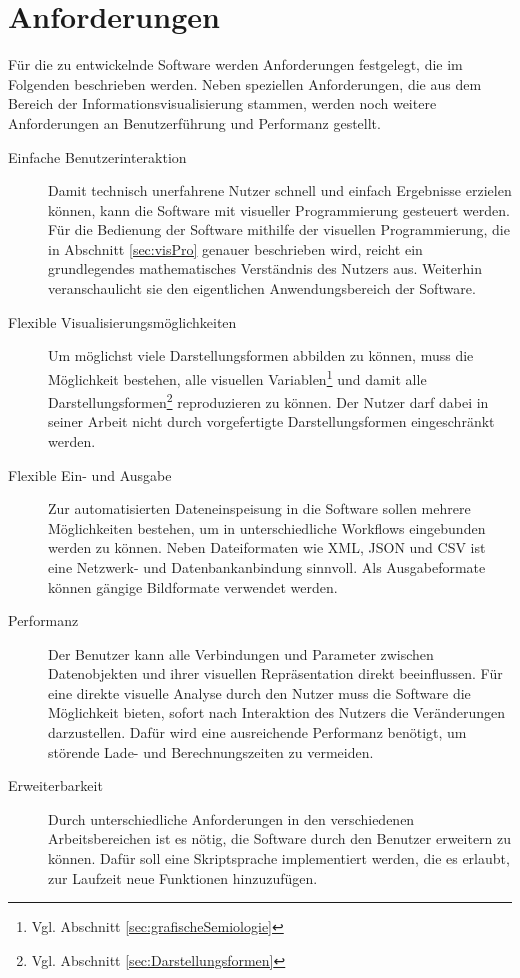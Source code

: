 \documentclass[a4paper, 
               12pt,
               DIV=calc,
               version=first,
               pdftex,
               headsepline,
               footsepline,
               bibliography=totocnumbered,
               listof=numbered]{scrreprt}
\begin{document}
\section{Anforderungen}
\label{sec:Anforderungen}
Für die zu entwickelnde Software werden Anforderungen festgelegt, die
im Folgenden beschrieben werden. Neben speziellen Anforderungen, die aus
dem Bereich der Informationsvisualisierung stammen, werden noch weitere
Anforderungen an Benutzerführung und Performanz gestellt.
\begin{description}
\item[Einfache Benutzerinteraktion]
Damit technisch unerfahrene Nutzer schnell und einfach Ergebnisse erzielen können, kann die Software
mit visueller Programmierung gesteuert werden. Für die Bedienung der Software mithilfe der visuellen
Programmierung, die in Abschnitt \ref{sec:visPro} genauer beschrieben wird,
reicht ein grundlegendes mathematisches Verständnis des Nutzers aus.
Weiterhin veranschaulicht sie den eigentlichen Anwendungsbereich der Software.
\item[Flexible Visualisierungsmöglichkeiten]
Um möglichst viele Darstellungsformen abbilden zu können, muss die 
Möglichkeit bestehen, alle visuellen Variablen\footnote{Vgl. Abschnitt
\ref{sec:grafischeSemiologie}} und damit alle Darstellungsformen\footnote{Vgl. Abschnitt
\ref{sec:Darstellungsformen}} reproduzieren zu können. Der Nutzer darf dabei
in seiner Arbeit nicht durch vorgefertigte Darstellungsformen
eingeschränkt werden.
\item[Flexible Ein- und Ausgabe]
Zur automatisierten Dateneinspeisung in die Software sollen mehrere Möglichkeiten
bestehen, um in unterschiedliche Workflows eingebunden werden zu können.
Neben Dateiformaten wie XML, JSON und CSV ist eine Netzwerk- und
Datenbankanbindung sinnvoll. Als Ausgabeformate können gängige Bildformate
verwendet werden.
\item[Performanz]
Der Benutzer kann alle Verbindungen und Parameter zwischen Datenobjekten und ihrer
visuellen Repräsentation direkt beeinflussen. Für eine direkte visuelle Analyse
durch den Nutzer muss die Software die Möglichkeit bieten, sofort
nach Interaktion des Nutzers die Veränderungen darzustellen. Dafür wird eine
ausreichende Performanz benötigt, um störende Lade- und Berechnungszeiten zu vermeiden.
\item[Erweiterbarkeit]
Durch unterschiedliche Anforderungen in den verschiedenen Arbeitsbereichen ist
es nötig, die Software durch den Benutzer erweitern zu können. Dafür soll eine Skriptsprache
implementiert werden, die es erlaubt, zur Laufzeit neue Funktionen hinzuzufügen.

\end{description}
\end{document}
